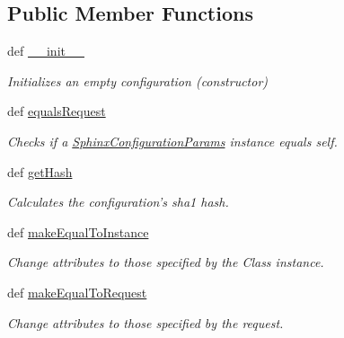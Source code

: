\subsection*{Public Member Functions}
\begin{DoxyCompactItemize}
\item 
def \hyperlink{classrapp__speech__detection__sphinx4_1_1sphinx4__configuration__params_1_1SphinxConfigurationParams_a1a4d416054657547de8dddfa9dc2f079}{\-\_\-\-\_\-init\-\_\-\-\_\-}
\begin{DoxyCompactList}\small\item\em Initializes an empty configuration (constructor) \end{DoxyCompactList}\item 
def \hyperlink{classrapp__speech__detection__sphinx4_1_1sphinx4__configuration__params_1_1SphinxConfigurationParams_a8709d996b4c60cf9fcf1fb4223ad6bef}{equals\-Request}
\begin{DoxyCompactList}\small\item\em Checks if a \hyperlink{classrapp__speech__detection__sphinx4_1_1sphinx4__configuration__params_1_1SphinxConfigurationParams}{Sphinx\-Configuration\-Params} instance equals self. \end{DoxyCompactList}\item 
def \hyperlink{classrapp__speech__detection__sphinx4_1_1sphinx4__configuration__params_1_1SphinxConfigurationParams_a0e50052e40575005b7002030689e8d47}{get\-Hash}
\begin{DoxyCompactList}\small\item\em Calculates the configuration's sha1 hash. \end{DoxyCompactList}\item 
def \hyperlink{classrapp__speech__detection__sphinx4_1_1sphinx4__configuration__params_1_1SphinxConfigurationParams_a214b52656d5823111d4be524470c4f58}{make\-Equal\-To\-Instance}
\begin{DoxyCompactList}\small\item\em Change attributes to those specified by the Class instance. \end{DoxyCompactList}\item 
def \hyperlink{classrapp__speech__detection__sphinx4_1_1sphinx4__configuration__params_1_1SphinxConfigurationParams_a72079f0f14a0dad90b4a2bbe8c98cc5c}{make\-Equal\-To\-Request}
\begin{DoxyCompactList}\small\item\em Change attributes to those specified by the request. \end{DoxyCompactList}\end{DoxyCompactItemize}
